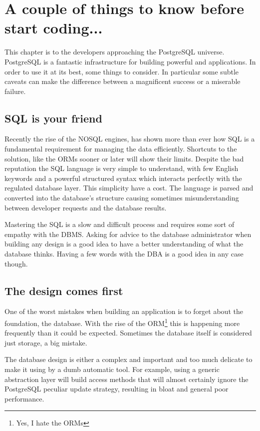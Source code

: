 \chapter{A couple of things to know before start coding...}
\label{cha:COUPLETHINGS}
This chapter is to the developers approaching the PostgreSQL universe. PostgreSQL is a fantastic 
infrastructure for building powerful and applications. In order to use it at its best,  some things to 
consider. In particular some subtle caveats can make the difference between a magnificent success or a 
miserable failure. 

\section{SQL is your friend}
Recently the rise of the NOSQL engines, has shown more than ever how SQL is a fundamental requirement for 
managing the data efficiently. Shortcuts to the solution, like the ORMs sooner or later will show their 
limits. Despite the bad reputation the SQL language is very simple to understand, with few English keywords
and a powerful structured syntax which interacts perfectly with the regulated database layer. 
This simplicity have a cost. The language is parsed and converted into the database's structure causing 
sometimes misunderstanding between developer requests and the database results.\newline 

Mastering the SQL is a slow and difficult process and requires some sort of empathy with the DBMS. 
Asking for advice to the database administrator when building any design is a good idea to have a better 
understanding of what the database thinks. Having a few words with the DBA is a good idea in any case 
though.

\section{The design comes first}
One of the worst mistakes when building an application is to forget about the foundation, the 
database. With the rise of the ORM\footnote{Yes, I hate the ORMs} this is happening more frequently than it 
could be expected. Sometimes the database itself is considered just storage, a big mistake.\newline

The database design is either a complex and important and too much delicate to make it using by a dumb 
automatic tool. For example, using a generic abstraction layer will build access methods that will almost 
certainly ignore the PostgreSQL peculiar update strategy, resulting in bloat and general poor 
performance.\newline

